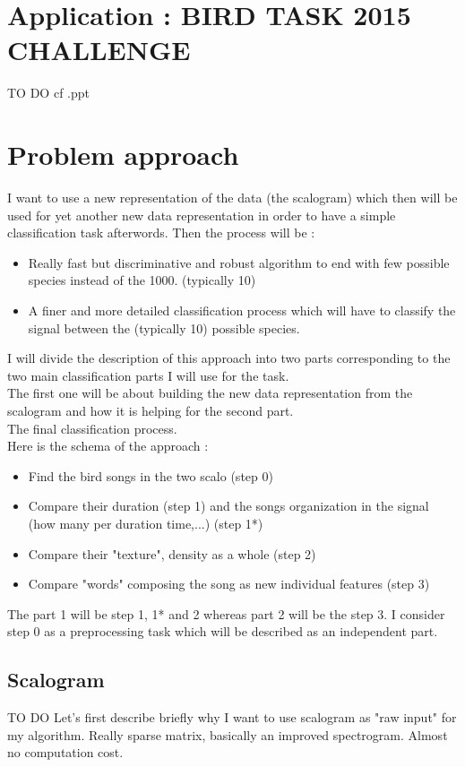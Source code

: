 \documentclass[a4paper]{article}
\begin{document}
\section{Application : BIRD TASK 2015 CHALLENGE}
TO DO cf .ppt
\section{Problem approach}
I want to use a new representation of the data (the scalogram) which then will be used for yet another new data representation in order to have a simple classification task afterwords. 
Then the process will be :
\begin{itemize}
\item Really fast but discriminative and robust algorithm to end with few possible species instead of the 1000. (typically 10)
\item A finer and more detailed classification process which will have to classify the signal between the (typically 10) possible species.
\end{itemize}

I will divide the description of this approach into two parts corresponding to the two main classification parts I will use for the task.
\\
The first one will be about building the new data  representation from the scalogram and how it is helping for the second part.
\\
The final classification process. 
\\
Here is the schema of the approach :
\begin{itemize}
\item Find the bird songs in the two scalo (step 0)
\item Compare their duration (step 1) and the songs organization in the signal (how many per duration time,...) (step 1*)
\item Compare their "texture", density as a whole (step 2)
\item Compare "words" composing the song as new individual features (step 3)
\end{itemize}
The part 1 will be step 1, 1* and 2 whereas part 2 will be the step 3. I consider step 0 as a preprocessing task which will be described as an independent part.
\subsection{Scalogram}
TO DO
Let's first describe briefly why I want to use scalogram as "raw input" for my algorithm.
Really sparse matrix, basically an improved spectrogram. Almost no computation cost.
\end{document}
